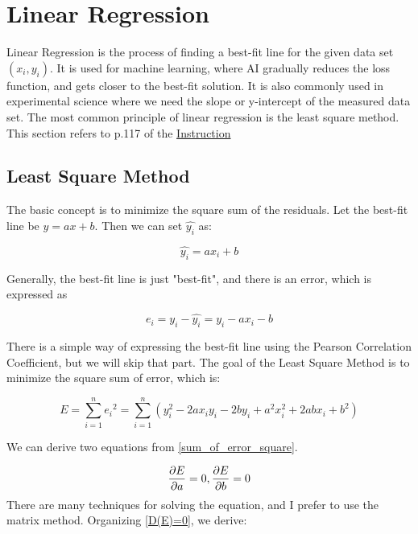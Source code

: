 \section{Linear Regression}

Linear Regression is the process of finding a best-fit line for the given data set $({x_i}, {y_i})$. It is used for machine learning, where AI gradually reduces the loss function, and gets closer to the best-fit solution. It is also commonly used in experimental science where we need the slope or y-intercept of the measured data set. The most common principle of linear regression is the least square method. This section refers to p.117 of the \href{https://education.ti.com/en/guidebook/details/en/FA1DC891957E4700B46A67255850C592/89ti}{Instruction}


\subsection{Least Square Method}
The basic concept is to minimize the square sum of the residuals. Let the best-fit line be $y = ax + b$. Then we can set $\hat{y_i}$ as:

\begin{equation}
    \hat{y_i} = ax_i + b
    \label{def_best-fit_line}
\end{equation}

Generally, the best-fit line is just "best-fit", and there is an error, which is expressed as

\begin{equation}
    e_i = y_i - \hat{y_i} = y_i - a{x_i} - b
    \label{def_error}
\end{equation}

There is a  simple way of expressing the best-fit line using the Pearson Correlation Coefficient, but we will skip that part. The goal of the Least Square Method is to minimize the square sum of error, which is:

\begin{equation}
    E = \sum_{i=1}^{n}{e_i}^2 = 
    \sum_{i=1}^{n}{(y_{i}^{2} - 2ax_{i}y_{i} - 2by_{i} + a^{2}x_{i}^{2} + 2abx_{i} + b^{2})}
    \label{sum_of_error_square}
\end{equation}

We can derive two equations from \ref{sum_of_error_square}.

\begin{equation}
    {{\partial E}\over{\partial a}} = 0, 
    {{\partial E}\over{\partial b}} = 0
    \label{D(E)=0}
\end{equation}
There are many techniques for solving the equation, and I prefer to use the matrix method. Organizing \ref{D(E)=0}, we derive:

